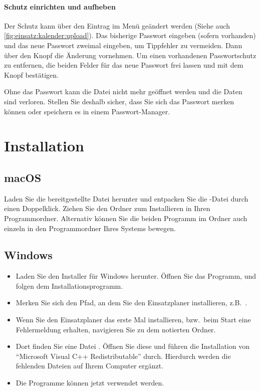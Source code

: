 \paragraph{Schutz einrichten und aufheben}
Der Schutz kann über den Eintrag  im Menü  geändert werden (Siehe auch \cref{fig:einsatz:kalender:upload}).
Das bisherige Passwort eingeben (sofern vorhanden) und das neue Passwort zweimal eingeben, um Tippfehler zu vermeiden.
Dann über den Knopf  die Änderung vornehmen.
Um einen vorhandenen Passwortschutz zu entfernen,
die beiden Felder für das neue Passwort frei lassen und mit dem Knopf bestätigen.


\begin{hinweis}
  Ohne das Passwort kann die Datei nicht mehr geöffnet werden und die Daten sind verloren.
  Stellen Sie deshalb sicher,
  dass Sie sich das Passwort merken können oder speichern es in einem Passwort-Manager.
\end{hinweis}


\section{Installation}\label{epl:allg:installation}
\subsection{macOS}
Laden Sie die bereitgestellte Datei herunter und entpacken Sie die -Datei durch einen Doppelklick.
Ziehen Sie den Ordner  zum Installieren in Ihren Programmordner.
Alternativ können Sie die beiden Programm im Ordner  auch einzeln in den Programmordner Ihres Systems bewegen.

\subsection{Windows}
\begin{itemize}
  \item Laden Sie den Installer für Windows herunter.
  Öffnen Sie das Programm, und folgen dem Installationsprogramm.
  \item Merken Sie sich den Pfad, an dem Sie den Einsatzplaner installieren, z.B.\ .
  \item Wenn Sie den Einsatzplaner das erste Mal installieren,
  bzw.\ beim Start eine Fehlermeldung erhalten,
  navigieren Sie zu dem notierten Ordner.
  \item Dort finden Sie eine Datei .
  Öffnen Sie diese und führen die Installation von \enquote{Microsoft Visual C++ Redistributable} durch.
  Hierdurch werden die fehlenden Dateien auf Ihrem Computer ergänzt.
  \item Die Programme können jetzt verwendet werden.
\end{itemize}



